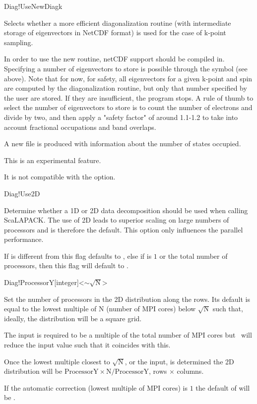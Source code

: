 \begin{fdflogicalF}{Diag!UseNewDiagk}

  Selects whether a more efficient diagonalization routine (with
  intermediate storage of eigenvectors in NetCDF format) is used for
  the case of k-point sampling.

  In order to use the new routine, netCDF support should be compiled
  in.  Specifying a number of eigenvectors to store is possible
  through the symbol  (see above). Note that for
  now, for safety, all eigenvectors for a given k-point and spin are
  computed by the diagonalization routine, but only that number
  specified by the user are stored. If they are insufficient, the
  program stops.  A rule of thumb to select the number of eigenvectors
  to store is to count the number of electrons and divide by two, and
  then apply a "safety factor" of around 1.1-1.2 to take into account
  fractional occupations and band overlaps.

  A new file  is produced with information about the number
  of states occupied.

  This is an experimental feature. 

  \note It is not compatible with the 
  option.

\end{fdflogicalF}


\begin{fdflogicalT}{Diag!Use2D}

  Determine whether a 1D or 2D data decomposition should be used when
  calling ScaLAPACK. The use of 2D leads to superior scaling on large
  numbers of processors and is therefore the default. This option only
  influences the parallel performance.

  If  is different from  this flag
  defaults to \fdftrue, else if  is $1$ or the
  total number of processors, then this flag will default to
  \fdffalse.

\end{fdflogicalT}

\begin{fdfentry}{Diag!ProcessorY}[integer]<$\sim \sqrt{\mathrm N}$>

  Set the number of processors in the 2D distribution along the rows.
  Its default is equal to the lowest multiple of $\mathrm N$ (number
  of MPI cores) below $\sqrt{\mathrm N}$ such that, ideally, the
  distribution will be a square grid.

  The input is required to be a multiple of the total number of MPI
  cores but \siesta\ will reduce the input value such that it
  coincides with this.

  Once the lowest multiple closest to $\sqrt{\mathrm N}$, or the input, is
  determined the 2D distribution will be $\mathrm{ProcessorY}
  \times\mathrm{N}/\mathrm{ProcessorY}$, rows $\times$ columns.

  \note If the automatic correction (lowest multiple of MPI cores) is
  $1$ the default of  will be \fdffalse.

\end{fdfentry}

